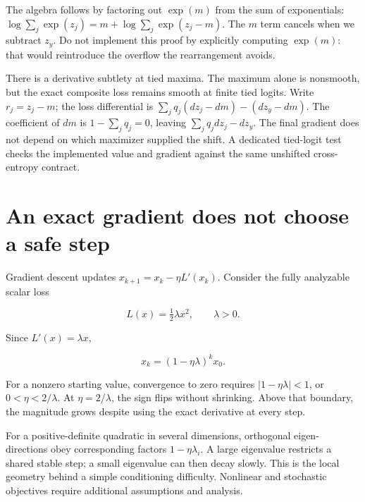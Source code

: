 The algebra follows by factoring out \(\exp(m)\) from the sum of
exponentials: \(\log\sum_j\exp(z_j)=m+\log\sum_j\exp(z_j-m)\). The \(m\)
term cancels when we subtract \(z_y\). Do not implement this proof by
explicitly computing \(\exp(m)\): that would reintroduce the overflow
the rearrangement avoids.

There is a derivative subtlety at tied maxima. The maximum alone is
nonsmooth, but the exact composite loss remains smooth at finite tied
logits. Write \(r_j=z_j-m\); the loss differential is
\(\sum_j q_j(dz_j-dm)-(dz_y-dm)\). The coefficient of \(dm\) is
\(1-\sum_jq_j=0\), leaving \(\sum_jq_jdz_j-dz_y\). The final gradient
does not depend on which maximizer supplied the shift. A dedicated
tied-logit test checks the implemented value and gradient against the
same unshifted cross-entropy contract.

\section{An exact gradient does not choose a safe
step}\label{an-exact-gradient-does-not-choose-a-safe-step}

Gradient descent updates \(x_{k+1}=x_k-\eta L'(x_k)\). Consider the
fully analyzable scalar loss

\begin{equation}
L(x)=\tfrac12\lambda x^2,\qquad\lambda>0.
\end{equation}

Since \(L'(x)=\lambda x\),

\begin{equation}
x_k=(1-\eta\lambda)^k x_0.
\end{equation}

For a nonzero starting value, convergence to zero requires
\(|1-\eta\lambda|<1\), or \(0<\eta<2/\lambda\). At \(\eta=2/\lambda\),
the sign flips without shrinking. Above that boundary, the magnitude
grows despite using the exact derivative at every step.


For a positive-definite quadratic in several dimensions, orthogonal
eigen-directions obey corresponding factors \(1-\eta\lambda_i\). A large
eigenvalue restricts a shared stable step; a small eigenvalue can then
decay slowly. This is the local geometry behind a simple conditioning
difficulty. Nonlinear and stochastic objectives require additional
assumptions and analysis.

